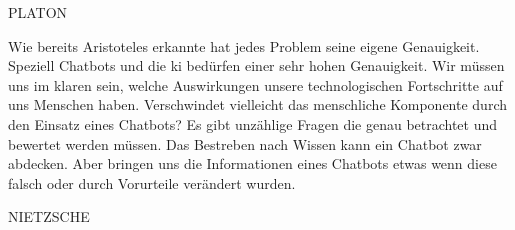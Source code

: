 PLATON

Wie bereits Aristoteles erkannte hat jedes Problem seine eigene Genauigkeit. Speziell Chatbots und die \ac{ki} bedürfen einer sehr hohen Genauigkeit. Wir müssen uns im klaren sein, welche Auswirkungen unsere technologischen Fortschritte auf uns Menschen haben. Verschwindet vielleicht das menschliche Komponente durch den Einsatz eines Chatbots? Es gibt unzählige Fragen die genau betrachtet und bewertet werden müssen. Das Bestreben nach Wissen kann ein Chatbot zwar abdecken. Aber bringen uns die Informationen eines Chatbots etwas wenn diese falsch oder durch Vorurteile verändert wurden.  

NIETZSCHE




